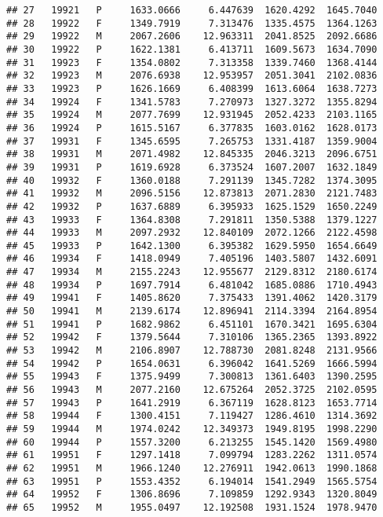 \documentclass[]{article}
\begin{document}
\begin{verbatim}
## 27   19921   P     1633.0666     6.447639  1620.4292  1645.7040
## 28   19922   F     1349.7919     7.313476  1335.4575  1364.1263
## 29   19922   M     2067.2606    12.963311  2041.8525  2092.6686
## 30   19922   P     1622.1381     6.413711  1609.5673  1634.7090
## 31   19923   F     1354.0802     7.313358  1339.7460  1368.4144
## 32   19923   M     2076.6938    12.953957  2051.3041  2102.0836
## 33   19923   P     1626.1669     6.408399  1613.6064  1638.7273
## 34   19924   F     1341.5783     7.270973  1327.3272  1355.8294
## 35   19924   M     2077.7699    12.931945  2052.4233  2103.1165
## 36   19924   P     1615.5167     6.377835  1603.0162  1628.0173
## 37   19931   F     1345.6595     7.265753  1331.4187  1359.9004
## 38   19931   M     2071.4982    12.845335  2046.3213  2096.6751
## 39   19931   P     1619.6928     6.373524  1607.2007  1632.1849
## 40   19932   F     1360.0188     7.291139  1345.7282  1374.3095
## 41   19932   M     2096.5156    12.873813  2071.2830  2121.7483
## 42   19932   P     1637.6889     6.395933  1625.1529  1650.2249
## 43   19933   F     1364.8308     7.291811  1350.5388  1379.1227
## 44   19933   M     2097.2932    12.840109  2072.1266  2122.4598
## 45   19933   P     1642.1300     6.395382  1629.5950  1654.6649
## 46   19934   F     1418.0949     7.405196  1403.5807  1432.6091
## 47   19934   M     2155.2243    12.955677  2129.8312  2180.6174
## 48   19934   P     1697.7914     6.481042  1685.0886  1710.4943
## 49   19941   F     1405.8620     7.375433  1391.4062  1420.3179
## 50   19941   M     2139.6174    12.896941  2114.3394  2164.8954
## 51   19941   P     1682.9862     6.451101  1670.3421  1695.6304
## 52   19942   F     1379.5644     7.310106  1365.2365  1393.8922
## 53   19942   M     2106.8907    12.788730  2081.8248  2131.9566
## 54   19942   P     1654.0631     6.396042  1641.5269  1666.5994
## 55   19943   F     1375.9499     7.300813  1361.6403  1390.2595
## 56   19943   M     2077.2160    12.675264  2052.3725  2102.0595
## 57   19943   P     1641.2919     6.367119  1628.8123  1653.7714
## 58   19944   F     1300.4151     7.119427  1286.4610  1314.3692
## 59   19944   M     1974.0242    12.349373  1949.8195  1998.2290
## 60   19944   P     1557.3200     6.213255  1545.1420  1569.4980
## 61   19951   F     1297.1418     7.099794  1283.2262  1311.0574
## 62   19951   M     1966.1240    12.276911  1942.0613  1990.1868
## 63   19951   P     1553.4352     6.194014  1541.2949  1565.5754
## 64   19952   F     1306.8696     7.109859  1292.9343  1320.8049
## 65   19952   M     1955.0497    12.192508  1931.1524  1978.9470

\end{verbatim}
\end{document}
